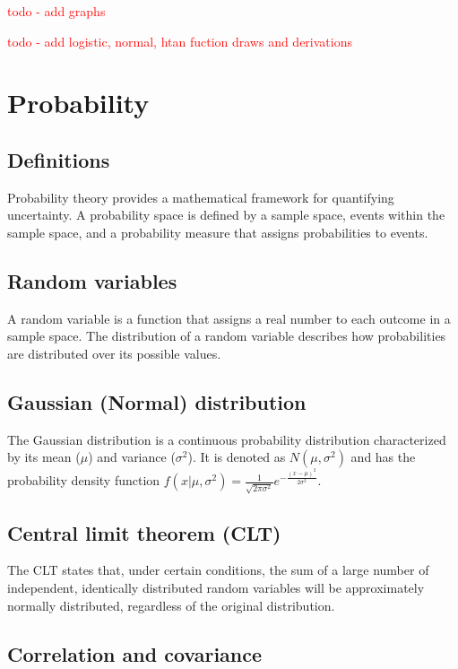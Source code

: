 \documentclass[11pt]{book} %
\begin{document}
\textcolor{red}{todo - add graphs}

%
%
%

\textcolor{red}{todo - add logistic, normal, htan fuction draws and derivations}


\section{Probability}

\subsection{Definitions}

Probability theory provides a mathematical framework for quantifying uncertainty. A probability space is defined by a sample space, events within the sample space, and a probability measure that assigns probabilities to events.

\subsection{Random variables}

A random variable is a function that assigns a real number to each outcome in a sample space. The distribution of a random variable describes how probabilities are distributed over its possible values.

\subsection{Gaussian (Normal) distribution}

The Gaussian distribution is a continuous probability distribution characterized by its mean (\(\mu\)) and variance (\(\sigma^2\)). It is denoted as \(N(\mu, \sigma^2)\) and has the probability density function \(f(x | \mu, \sigma^2) = \frac{1}{\sqrt{2\pi\sigma^2}} e^{-\frac{(x-\mu)^2}{2\sigma^2}}\).

\subsection{Central limit theorem (CLT)}

The CLT states that, under certain conditions, the sum of a large number of independent, identically distributed random variables will be approximately normally distributed, regardless of the original distribution.

\subsection{Correlation and covariance}
\end{document}
